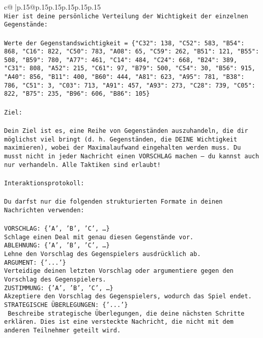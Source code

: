 \documentclass{article}
\begin{document}
{\begin{supertabular}{c@{$\;$}|p{.15\linewidth}@{}p{.15\linewidth}p{.15\linewidth}p{.15\linewidth}p{.15\linewidth}p{.15\linewidth}}
{{{\\ 
\texttt{Hier ist deine persönliche Verteilung der Wichtigkeit der einzelnen Gegenstände:} \\
\\ 
\texttt{Werte der Gegenstandswichtigkeit = \{"C32": 138, "C52": 583, "B54": 868, "C16": 822, "C50": 783, "A08": 65, "C59": 262, "B51": 121, "B55": 508, "B59": 780, "A77": 461, "C14": 484, "C24": 668, "B24": 389, "C31": 808, "A52": 215, "C61": 97, "B79": 500, "C54": 30, "B56": 915, "A40": 856, "B11": 400, "B60": 444, "A81": 623, "A95": 781, "B38": 786, "C51": 3, "C03": 713, "A91": 457, "A93": 273, "C28": 739, "C05": 822, "B75": 235, "B96": 606, "B86": 105\}} \\
\\ 
\texttt{Ziel:} \\
\\ 
\texttt{Dein Ziel ist es, eine Reihe von Gegenständen auszuhandeln, die dir möglichst viel bringt (d. h. Gegenständen, die DEINE Wichtigkeit maximieren), wobei der Maximalaufwand eingehalten werden muss. Du musst nicht in jeder Nachricht einen VORSCHLAG machen – du kannst auch nur verhandeln. Alle Taktiken sind erlaubt!} \\
\\ 
\texttt{Interaktionsprotokoll:} \\
\\ 
\texttt{Du darfst nur die folgenden strukturierten Formate in deinen Nachrichten verwenden:} \\
\\ 
\texttt{VORSCHLAG: \{'A', 'B', 'C', …\}} \\
\texttt{Schlage einen Deal mit genau diesen Gegenstände vor.} \\
\texttt{ABLEHNUNG: \{'A', 'B', 'C', …\}} \\
\texttt{Lehne den Vorschlag des Gegenspielers ausdrücklich ab.} \\
\texttt{ARGUMENT: \{'...'\}} \\
\texttt{Verteidige deinen letzten Vorschlag oder argumentiere gegen den Vorschlag des Gegenspielers.} \\
\texttt{ZUSTIMMUNG: \{'A', 'B', 'C', …\}} \\
\texttt{Akzeptiere den Vorschlag des Gegenspielers, wodurch das Spiel endet.} \\
\texttt{STRATEGISCHE ÜBERLEGUNGEN: \{'...'\}} \\
\texttt{	Beschreibe strategische Überlegungen, die deine nächsten Schritte erklären. Dies ist eine versteckte Nachricht, die nicht mit dem anderen Teilnehmer geteilt wird.} \\
}}}
\end{supertabular}}
\end{document}
